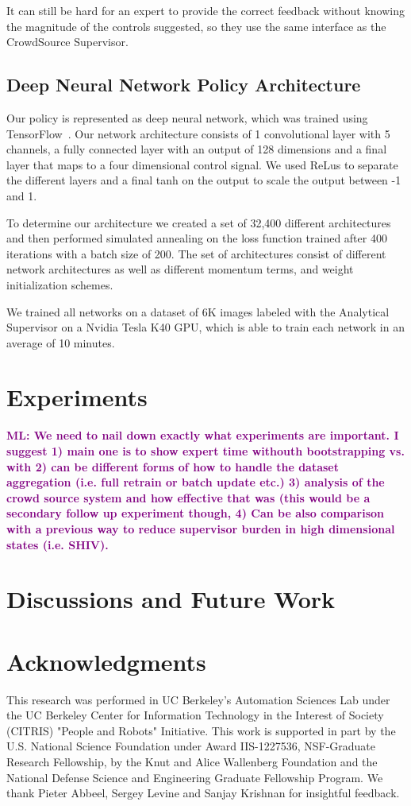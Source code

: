 \documentclass[10pt, conference]{ieeeconf}      %
\newcommand{\mlnote}[1]{\ifthenelse{ \boolean{include-notes}}%
 {\textcolor{purple}{\textbf{ML: #1}}}{}}
\begin{document}
It can still be hard for an expert to provide the correct feedback without knowing the magnitude of the controls suggested, so they use the same interface as the CrowdSource Supervisor. 

\subsection{Deep Neural Network Policy Architecture}
Our policy is represented as deep neural network, which was trained using TensorFlow~\cite{tensorflow2015-whitepaper}. Our network architecture consists of 1 convolutional layer with 5 channels, a fully connected layer with an output of 128 dimensions and a final layer that maps to a four dimensional control signal. We used ReLus to separate the different layers and a final tanh on the output to scale the output between -1 and 1. 

To determine our architecture we created a set of 32,400 different architectures and then performed simulated annealing on the loss function trained after 400 iterations with a batch size of 200. The set of architectures consist of different network architectures as well as different momentum terms, and weight initialization schemes. 

We trained all networks on a dataset of 6K images labeled with the Analytical Supervisor on a Nvidia Tesla K40 GPU, which is able to train each network in an average of 10 minutes.  


\section{Experiments}

\mlnote{We need to nail down exactly what experiments are important. I suggest 1) main one is to show expert time withouth bootstrapping vs. with 2) can be different forms of how to handle the dataset aggregation (i.e. full retrain or batch update etc.) 3) analysis of the crowd source system and how effective that was (this would be a secondary follow up experiment though, 4) Can be also comparison with a previous way to reduce supervisor burden in high dimensional states (i.e. SHIV). }

 
\section{Discussions and Future Work}

 \section{Acknowledgments} 
This research was performed in UC Berkeley's Automation Sciences Lab under the UC Berkeley Center for Information Technology in the Interest of Society (CITRIS) "People and Robots" Initiative. This work is supported in part by the U.S. National Science Foundation under Award IIS-1227536, NSF-Graduate Research Fellowship, by the Knut and Alice Wallenberg Foundation and the National Defense Science and Engineering Graduate Fellowship Program. We thank Pieter Abbeel, Sergey Levine and Sanjay Krishnan for insightful feedback. 

  


\end{document}
